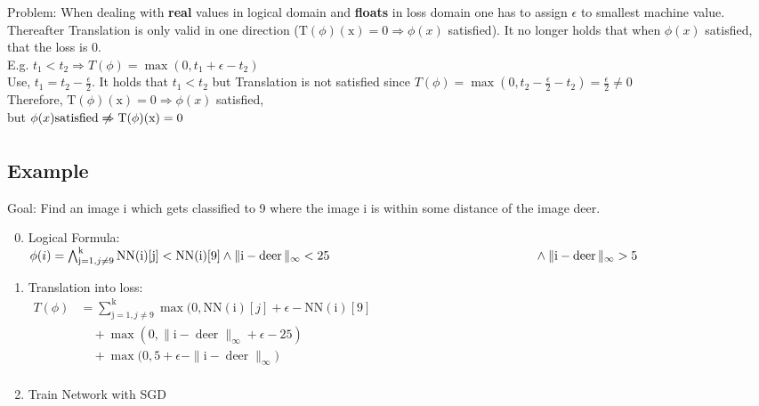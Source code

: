 \documentclass[11pt]{extarticle}
\begin{document}
\begin{multicols*}{3}
\begin{center}
            \end{center}
            Problem: When dealing with \textbf{real} values in logical domain and \textbf{floats} in loss domain one has to assign $\epsilon$ to smallest machine value. Thereafter Translation is only valid in one direction ($\mathrm { T } ( \phi ) ( \mathrm { x } ) = 0 \Rightarrow \phi(x)$ satisfied). It no longer holds that when $\phi(x)$ satisfied, that the loss is 0.\\
            E.g. $t_1 < t_2 \Rightarrow T(\phi) =\max (0, t_1 + \epsilon - t_2) $\\
            Use, $t_1 = t_2 - \frac{\epsilon}{2}$.
            It holds that $t_1 < t_2$ but Translation is not satisfied since $T(\phi) = \max (0, t_2 - \frac{\epsilon}{2}- t_2 ) = \frac{\epsilon}{2} \neq 0$\\
            Therefore, $\mathrm { T } ( \phi ) ( \mathrm { x } ) = 0 \Rightarrow \phi(x)$ satisfied, \\but $ \phi(x) \text{satisfied} \centernot{\xRightarrow{}} \mathrm { T } ( \phi ) ( \mathrm { x } ) = 0$
            \subsection*{Example}
                Goal: Find an image i which
                        gets classified to 9
                        where the image i is
                        within some distance
                        of the image deer.
             \begin{enumerate}[leftmargin=*]
             \setcounter{enumi}{-1} 
            \item Logical Formula:\\
            $\phi(i) = \bigwedge _ { \mathrm { j } = 1 , j \neq 9 } ^ { \mathrm { k } } \mathrm { NN } ( \mathrm { i } ) [ \mathrm { j } ] < \mathrm { NN } ( \mathrm { i } ) [ 9 ] \wedge \| \mathrm { i } - \operatorname { deer } \| _ { \infty } < 25 \\ \null \hspace{5.8cm} \wedge \| \mathrm { i } - \operatorname { deer } \| _ { \infty } > 5$
            \item Translation into loss:\\
            $\begin{aligned}
            T (\phi)  & =
            {\sum}_ { \mathrm { j } = 1 , j \neq 9 } ^ { \mathrm { k }} \max ( 0 , \mathrm { NN } ( \mathrm { i } ) [ j ] + \epsilon - \mathrm { NN } ( \mathrm { i } ) [ 9 ] \\
            & \quad + { \max ( 0 ,  \| \mathrm { i } - \operatorname { deer } \| _ { \infty } + \epsilon - 25 )} \\ 
            & \quad + { \max ( 0 , } 5 + \epsilon - \| \mathrm { i } - \operatorname { deer } \| _ { \infty })\\
            \end{aligned}$
            \item Train Network with SGD
            

\end{enumerate}
\end{multicols*}
\end{document}
